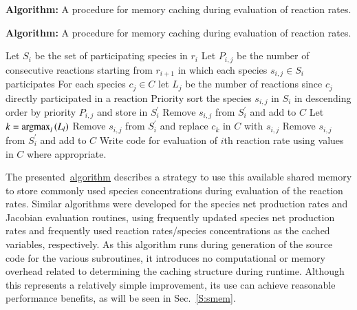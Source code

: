 \documentclass[final,twocolumn]{elsarticle}
\newcommand{\argmax}{\operatornamewithlimits{argmax}}
\begin{document}
\begin{algorithm}[htb]
\ifmeasure
\fontsize{8pt}{10pt}\selectfont
\caption{\fontsize{9pt}{10pt}\selectfont \textbf{Algorithm:} A procedure for memory caching during evaluation of reaction rates.\label{A:shared_mem_caching}}
\else
\caption{\textbf{Algorithm:} A procedure for memory caching during evaluation of reaction rates.\label{A:shared_mem_caching}}
\fi
\begin{algorithmic}[0]
    \State Let $S_i$ be the set of participating species in $r_i$
    \State Let $P_{i,j}$ be the number of consecutive reactions starting from $r_{i + 1}$ in which each species $s_{i,j} \in S_i$ participates
    \State For each species $c_j \in C$ let $L_j$ be the number of reactions since $c_j$ directly participated in a reaction
    \State Priority sort the species $s_{i,j}$ in $S_{i}$ in descending order by priority $P_{i,j}$ and store in $S_{i}^{\prime}$
		\State Remove $s_{i,j}$ from $S_{i}^{\prime}$ and add to $C$
	  \State Let $k = \argmax_l \left(L_l \right)$
	  \State Remove $s_{i,j}$ from $S_{i}^{\prime}$ and replace $c_k$ in $C$ with $s_{i,j}$
      \EndIf
    \EndFor
		\State Remove $s_{i,j}$ from $S_{i}^{\prime}$ and add to $C$
      \EndIf
    \EndFor
    \State Write code for evaluation of $i$th reaction rate using values in $C$ where appropriate.
  \EndFor
\end{algorithmic}
\end{algorithm}

The presented~\hyperref[A:shared_mem_caching]{algorithm} describes a strategy to use this available shared memory to store commonly used species concentrations during evaluation of the reaction rates.
Similar algorithms were developed for the species net production rates and Jacobian evaluation routines, using frequently updated species net production rates and frequently used reaction rates\slash species concentrations as the cached variables, respectively.
As this algorithm runs during generation of the source code for the various subroutines, it introduces no computational or memory overhead related to determining the caching structure during runtime.
Although this represents a relatively simple improvement, its use can achieve reasonable performance benefits, as will be seen in Sec.~\ref{S:smem}.
\end{document}

